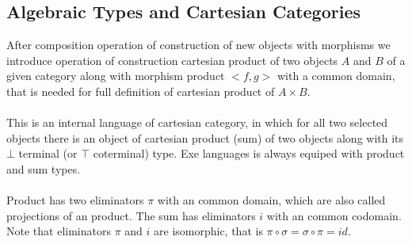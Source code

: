 \documentclass[11pt,oneside]{article}
\begin{document}
\newpage
\subsection{Algebraic Types and Cartesian Categories}

After composition operation of construction of new objects with morphisms we introduce
operation of construction cartesian product of two objects $A$ and $B$ of a given
category along with morphism product $<f,g>$ with a common domain, that is needed
for full definition of cartesian product of $A \times B$.

\paragraph{}
This is an internal language of cartesian category, in which for all two selected objects there is an object
of cartesian product (sum) of two objects along with its $\bot$ terminal (or $\top$ coterminal) type.
Exe languages is always equiped with product and sum types.

\paragraph{}
Product has two eliminators $\pi$ with an common domain, which are also called projections of an product.
The sum has eliminators $i$ with an common codomain.
Note that eliminators $\pi$ and $i$ are isomorphic, that is $\pi \circ \sigma = \sigma \circ \pi = id$.
\end{document}
